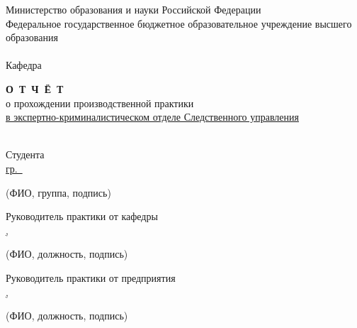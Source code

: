 \begin{titlepage}
	\newpage

	

	\makeatletter

	\begin{center}
		Министерство образования и науки Российской Федерации \\
		Федеральное государственное бюджетное образовательное учреждение
		высшего образования \\
		\university \\
		\vspace{0.8cm}
		Кафедра 
	\end{center}

	\vspace{1cm}

	\begin{center}
		{\Large \bf О~Т~Ч~Ё~Т} \\
		о прохождении производственной практики \\
		\uline{в экспертно-криминалистическом отделе Следственного управления}\\
		\\
		\vspace{0.8cm}
		\variant
	\end{center}

	\vspace{1cm}


	\begin{flushright}
		\begin{minipage}[H]{0.6\textwidth}
			\linespread{1.3}
			Студента \uline{\yourName\hfill} \\
			\uline{гр.~\group\hfill} \\
			\begin{centering}
				\footnotesize (ФИО, группа, подпись) \\
			\end{centering}
			\vspace{0.3cm}
			Руководитель практики от кафедры \\
			\uline{\deptChiefName, \deptChiefPosition\hfill} \\
			\begin{centering}
				\footnotesize (ФИО, должность, подпись) \\
			\end{centering}
			\vspace{0.3cm}
			Руководитель практики от предприятия \\
			\uline{\orgChiefName, \orgChiefPosition\hfill} \\
			\begin{centering}
				\footnotesize (ФИО, должность, подпись) \\
			\end{centering}
			\vspace{0.3cm}


\end{minipage}
\end{flushright}
\end{titlepage}
